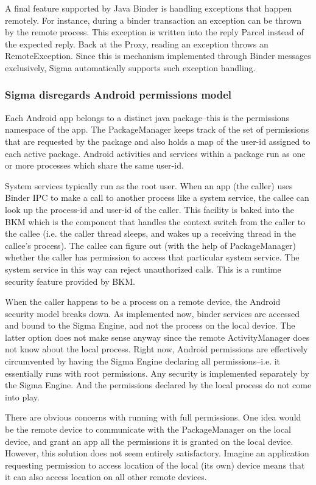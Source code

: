 \documentclass[prodmode]{acmlarge}
\begin{document}
A final feature supported by Java Binder is handling exceptions that happen remotely. For instance, during a binder transaction an exception can be thrown by the remote process. This exception is written into the reply Parcel instead of the expected reply. Back at the Proxy, reading an exception throws an RemoteException. Since this is mechanism implemented through Binder messages exclusively, Sigma automatically supports such exception handling.

\subsubsection{Sigma disregards Android permissions model}
\label{sec:DealingWithAndroidPermissions}
Each Android app belongs to a distinct java package--this is the permissions namespace of the app. The PackageManager keeps track of the set of permissions that are requested by the package and also holds a map of the user-id assigned to each active package. Android activities and services within a package run as one or more processes which share the same user-id.

System services typically run as the root user. When an app (the caller) uses Binder IPC to make a call to another process like a system service, the callee can look up the process-id and user-id of the caller. This facility is baked into the BKM which is the component that handles the context switch from the caller to the callee (i.e. the caller thread sleeps, and wakes up a receiving thread in the callee's process). The callee can figure out (with the help of PackageManager) whether the caller has permission to access that particular system service. The system service in this way can reject unauthorized calls. This is a runtime security feature provided by BKM.

When the caller happens to be a process on a remote device, the Android security model breaks down. As implemented now, binder services are accessed and bound to the Sigma Engine, and not the process on the local device. The latter option does not make sense anyway since the remote ActivityManager does not know about the local process. Right now, Android permissions are effectively circumvented by having the Sigma Engine declaring all permissions--i.e. it essentially runs with root permissions. Any security is implemented separately by the Sigma Engine. And the permissions declared by the local process do not come into play.

There are obvious concerns with running with full permissions. One idea would be the remote device to communicate with the PackageManager on the local device, and grant an app all the permissions it is granted on the local device. However, this solution does not seem entirely satisfactory. Imagine an application requesting permission to access location of the local (its own) device means that it can also access location on all other remote devices.
\end{document}
